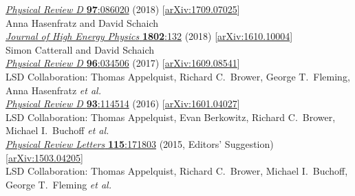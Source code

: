 \begin{spacelist}
\begin{revnumerate}
      \href{http://dx.doi.org/10.1103/PhysRevD.97.086020}{\textit{Physical Review D} \textbf{97}:086020} (2018) [\href{http://arxiv.org/abs/1709.07025}{arXiv:1709.07025}]
    \pagebreakitem
       \\
      Anna Hasenfratz and David Schaich \\
      \href{http://dx.doi.org/10.1007/JHEP02(2018)132}{\textit{Journal of High Energy Physics} \textbf{1802}:132} (2018) [\href{http://arxiv.org/abs/1610.10004}{arXiv:1610.10004}]
    \pagebreakitem
       \\
      Simon Catterall and David Schaich \\
      \href{http://dx.doi.org/10.1103/PhysRevD.96.034506}{\textit{Physical Review D} \textbf{96}:034506} (2017) [\href{http://arxiv.org/abs/1609.08541}{arXiv:1609.08541}]
    \pagebreakitem
       \\
      LSD Collaboration: Thomas Appelquist, Richard C.~Brower, George T.~Fleming, Anna Hasenfratz \textit{et al.} \\ %
      \href{http://dx.doi.org/10.1103/PhysRevD.93.114514}{\textit{Physical Review D} \textbf{93}:114514} (2016) [\href{http://arxiv.org/abs/1601.04027}{arXiv:1601.04027}]
    \pagebreakitem
       \\
      LSD Collaboration: Thomas Appelquist, Evan Berkowitz, Richard C.~Brower, Michael I.~Buchoff \textit{et al.} \\ %
      \href{http://dx.doi.org/10.1103/PhysRevLett.115.171803}{\textit{Physical Review Letters} \textbf{115}:171803} (2015, Editors' Suggestion) [\href{http://arxiv.org/abs/1503.04205}{arXiv:1503.04205}]
    \pagebreakitem
       \\
      LSD Collaboration: Thomas Appelquist, Richard C.~Brower, Michael I.~Buchoff, George T.~Fleming \textit{et al.} \\ %

\end{revnumerate}
\end{spacelist}
